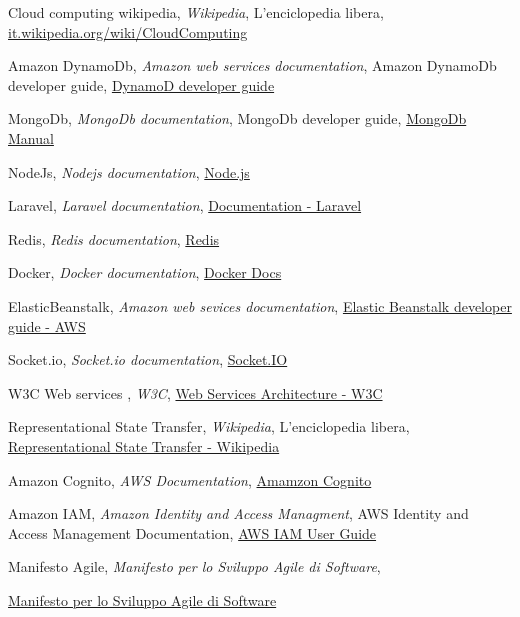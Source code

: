 
\begin{thebibliography}{9}

  Cloud computing wikipedia,
  \emph{Wikipedia},
  L'enciclopedia libera,
  {\href{http://it.wikipedia.org/wiki/Cloud_computing}{it.wikipedia.org/wiki/CloudComputing}}


  Amazon DynamoDb,
  \emph{Amazon web services documentation},
  Amazon DynamoDb developer guide,
  {\href{http://docs.aws.amazon.com/amazondynamodb/latest/developerguide/Introduction.html}{DynamoD developer guide}}



  MongoDb,
  \emph{MongoDb documentation},
  MongoDb developer guide,
  {\href{https://docs.mongodb.org/manual}{MongoDb Manual}}



  NodeJs,
  \emph{Nodejs documentation},
  {\href{https://nodejs.org/en/}{Node.js}}


  Laravel,
  \emph{Laravel documentation},
  {\href{https://laravel.com/docs/5.2}{Documentation - Laravel }}


  Redis,
  \emph{Redis documentation},
  {\href{http://redis.io/documentation}{Redis}}


  Docker,
  \emph{Docker documentation},
  {\href{https://docs.docker.com}{Docker Docs}}


  ElasticBeanstalk,
  \emph{Amazon web sevices documentation},
  {\href{http://docs.aws.amazon.com/elasticbeanstalk/latest/dg/Welcome.html}{Elastic Beanstalk developer guide - AWS}}

  Socket.io,
  \emph{Socket.io documentation},
  {\href{http://socket.io}{Socket.IO}}

   W3C Web services ,
  \emph{W3C},
   {\href{https://www.w3.org/TR/ws-arch/}{Web Services Architecture - W3C}}

  Representational State Transfer,
  \emph{Wikipedia},
  L'enciclopedia libera,
  {\href{https://it.wikipedia.org/wiki/Representational_State_Transfer}{Representational State Transfer - Wikipedia}}

  Amazon Cognito,
  \emph{AWS Documentation},
  {\href{http://docs.aws.amazon.com/cognitoidentity/latest/APIReference/Welcome.html}{Amamzon Cognito}}

  Amazon IAM,
  \emph{Amazon Identity and Access Managment},
  AWS Identity and Access Management Documentation,
  {\href{http://docs.aws.amazon.com/IAM/latest/UserGuide/introduction.html}{AWS IAM User Guide}}

  Manifesto Agile,
  \emph{Manifesto per lo Sviluppo Agile di Software},
  
  {\href{http://agilemanifesto.org/iso/it/}{Manifesto per lo Sviluppo Agile di Software}}


  

  


  


  	


\end{thebibliography}

